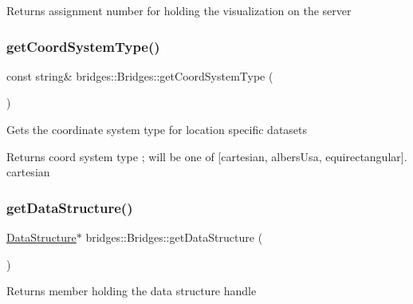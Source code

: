 \begin{DoxyReturn}{Returns}
assignment number for holding the visualization on the server 
\end{DoxyReturn}
\mbox{\label{classbridges_1_1_bridges_aac3cdb607177ff537f5160c3790d814a}} 
\subsubsection{\texorpdfstring{get\+Coord\+System\+Type()}{getCoordSystemType()}}
{\footnotesize\ttfamily const string\& bridges\+::\+Bridges\+::get\+Coord\+System\+Type (\begin{DoxyParamCaption}{ }\end{DoxyParamCaption})\hspace{0.3cm}{\ttfamily [inline]}}

Gets the coordinate system type for location specific datasets

\begin{DoxyReturn}{Returns}
coord system type ; will be one of \mbox{[}\textquotesingle{}cartesian\textquotesingle{}, \textquotesingle{}albers\+Usa\textquotesingle{}, \textquotesingle{}equirectangular\textquotesingle{}\mbox{]}. \textquotesingle{}cartesian\textquotesingle{} 
\end{DoxyReturn}
\mbox{\label{classbridges_1_1_bridges_a5ddfb17c2fb2d3ca89e7564677251dea}} 
\subsubsection{\texorpdfstring{get\+Data\+Structure()}{getDataStructure()}}
{\footnotesize\ttfamily \mbox{\hyperlink{classbridges_1_1_data_structure}{Data\+Structure}}$\ast$ bridges\+::\+Bridges\+::get\+Data\+Structure (\begin{DoxyParamCaption}{ }\end{DoxyParamCaption})\hspace{0.3cm}{\ttfamily [inline]}}

\begin{DoxyReturn}{Returns}
member holding the data structure handle 
\end{DoxyReturn}
\mbox{\label{classbridges_1_1_bridges_ae9f238e1d9fc421c6c08aacb74e0ef6c}} 
